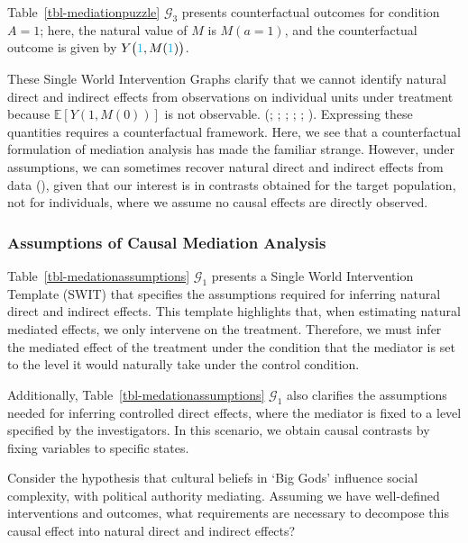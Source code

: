 \documentclass[
  single column]{article}
\begin{document}
Table~\ref{tbl-mediationpuzzle} \(\mathcal{G}_3\) presents
counterfactual outcomes for condition \(A = 1\); here, the natural value
of \(M\) is \(M(a = 1)\), and the counterfactual outcome is given by
\(Y\big(\textcolor{cyan}{1}, M(\textcolor{cyan}{1})\big)\).

These Single World Intervention Graphs clarify that we cannot identify
natural direct and indirect effects from observations on individual
units under treatment because \(\mathbb{E}[Y(1, M(0))]\) is not
observable. (;
;
;
;
;
). Expressing
these quantities requires a counterfactual framework. Here, we see that
a counterfactual formulation of mediation analysis has made the familiar
strange. However, under assumptions, we can sometimes recover natural
direct and indirect effects from data
(), given that our
interest is in contrasts obtained for the target population, not for
individuals, where we assume no causal effects are directly observed.

\subsubsection{Assumptions of Causal Mediation
Analysis}\label{assumptions-of-causal-mediation-analysis}

Table~\ref{tbl-medationassumptions} \(\mathcal{G}_1\) presents a Single
World Intervention Template (SWIT) that specifies the assumptions
required for inferring natural direct and indirect effects. This
template highlights that, when estimating natural mediated effects, we
only intervene on the treatment. Therefore, we must infer the mediated
effect of the treatment under the condition that the mediator is set to
the level it would naturally take under the control condition.

Additionally, Table~\ref{tbl-medationassumptions} \(\mathcal{G}_1\) also
clarifies the assumptions needed for inferring controlled direct
effects, where the mediator is fixed to a level specified by the
investigators. In this scenario, we obtain causal contrasts by fixing
variables to specific states.

Consider the hypothesis that cultural beliefs in `Big Gods' influence
social complexity, with political authority mediating. Assuming we have
well-defined interventions and outcomes, what requirements are necessary
to decompose this causal effect into natural direct and indirect
effects?
\end{document}
